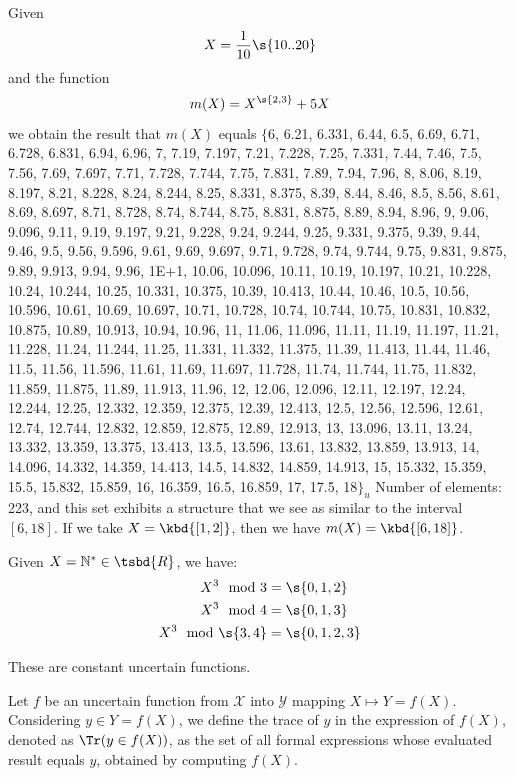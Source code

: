 \begin{example}
	Given $$X = \dfrac{1}{10}\s{10..20} $$ and the function $$m(X) = X^{\s{2,3}}+5X $$ we obtain the result that $m(X)$ equals
	$\{$6, 6.21, 6.331, 6.44, 6.5, 6.69, 6.71, 6.728, 6.831, 6.94, 6.96, 7, 7.19, 7.197, 7.21, 7.228, 7.25, 7.331, 7.44, 7.46, 7.5, 7.56, 7.69, 7.697, 7.71, 7.728, 7.744, 7.75, 7.831, 7.89, 7.94, 7.96, 8, 8.06, 8.19, 8.197, 8.21, 8.228, 8.24, 8.244, 8.25, 8.331, 8.375, 8.39, 8.44, 8.46, 8.5, 8.56, 8.61, 8.69, 8.697, 8.71, 8.728, 8.74, 8.744, 8.75, 8.831, 8.875, 8.89, 8.94, 8.96, 9, 9.06, 9.096, 9.11, 9.19, 9.197, 9.21, 9.228, 9.24, 9.244, 9.25, 9.331, 9.375, 9.39, 9.44, 9.46, 9.5, 9.56, 9.596, 9.61, 9.69, 9.697, 9.71, 9.728, 9.74, 9.744, 9.75, 9.831, 9.875, 9.89, 9.913, 9.94, 9.96, 1E+1, 10.06, 10.096, 10.11, 10.19, 10.197, 10.21, 10.228, 10.24, 10.244, 10.25, 10.331, 10.375, 10.39, 10.413, 10.44, 10.46, 10.5, 10.56, 10.596, 10.61, 10.69, 10.697, 10.71, 10.728, 10.74, 10.744, 10.75, 10.831, 10.832, 10.875, 10.89, 10.913, 10.94, 10.96, 11, 11.06, 11.096, 11.11, 11.19, 11.197, 11.21, 11.228, 11.24, 11.244, 11.25, 11.331, 11.332, 11.375, 11.39, 11.413, 11.44, 11.46, 11.5, 11.56, 11.596, 11.61, 11.69, 11.697, 11.728, 11.74, 11.744, 11.75, 11.832, 11.859, 11.875, 11.89, 11.913, 11.96, 12, 12.06, 12.096, 12.11, 12.197, 12.24, 12.244, 12.25, 12.332, 12.359, 12.375, 12.39, 12.413, 12.5, 12.56, 12.596, 12.61, 12.74, 12.744, 12.832, 12.859, 12.875, 12.89, 12.913, 13, 13.096, 13.11, 13.24, 13.332, 13.359, 13.375, 13.413, 13.5, 13.596, 13.61, 13.832, 13.859, 13.913, 14, 14.096, 14.332, 14.359, 14.413, 14.5, 14.832, 14.859, 14.913, 15, 15.332, 15.359, 15.5, 15.832, 15.859, 16, 16.359, 16.5, 16.859, 17, 17.5, 18$\}_u$
	\newline \noindent Number of elements: 223, and this set exhibits a structure that we see as similar to the interval $[6,18]$.
	\newline \noindent If we take $X = \kbd{[1,2]}$, then we have $m(X) = \kbd{[6,18]}$.
\end{example}
\begin{example}
	Given $X = \mathbb{N^*} \in \tsbd{R}$, we have:
	\begin{align*}
		X^3 \mod 3 &= \s{0,1,2} \\
		X^3 \mod 4 &= \s{0,1,3} \\
		X^3 \mod \s{3,4} &= \s{0,1,2,3}
	\end{align*}

	These are constant uncertain functions.
\end{example}
\begin{definition}[Trace]
	Let $f$ be an uncertain function from $\mathcal{X}$ into $\mathcal{Y}$ mapping $X \mapsto Y = f(X)$.
	\newline \noindent
	Considering $y \in Y = f(X)$, we define the trace of $y$ in the expression of $f(X)$, denoted as $\Tr(y \in f(X))$, as the set of all formal expressions whose evaluated result equals $y$, obtained by computing $f(X)$.
\end{definition}
